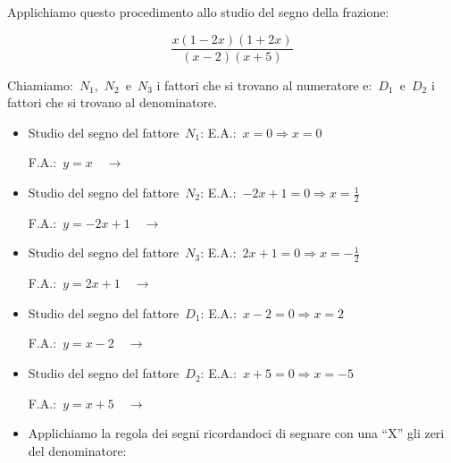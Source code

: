\begin{exrig}
 \begin{esempio}
Applichiamo questo procedimento allo studio del segno della frazione:

\[\frac{x(1 -2 x)(1 + 2 x)}{(x -2)(x +5)}\]

Chiamiamo:~$N_1$,~$N_2$~e~$N_3$ i fattori che si trovano al numeratore 
e:~$D_1$~e~$D_2$ i fattori che si trovano al denominatore.

\begin{itemize}
 \item Studio del segno del fattore~$N_1$:
 \subitem E.A.:~$x=0 \Rightarrow x=0$
 \subitem
  \begin{minipage}{.25\textwidth}
   F.A.:~$y = x \quad \rightarrow$
  \end{minipage}
  \begin{minipage}{.30\textwidth}
   
  \end{minipage}
 \item Studio del segno del fattore~$N_2$:
 \subitem E.A.:~$-2 x +1=0 \Rightarrow x=\frac{1}{2}$
 \subitem
  \begin{minipage}{.25\textwidth}
   F.A.:~$y = -2 x +1 \quad \rightarrow$
  \end{minipage}
  \begin{minipage}{.30\textwidth}
  
  \end{minipage}
 \item Studio del segno del fattore~$N_3$:
 \subitem E.A.:~$2 x +1=0 \Rightarrow x=- \frac{1}{2}$
 \subitem
  \begin{minipage}{.25\textwidth}
   F.A.:~$y=2 x +1 \quad \rightarrow$
  \end{minipage}
  \begin{minipage}{.30\textwidth}
  
  \end{minipage}
 \item Studio del segno del fattore~$D_1$:
 \subitem E.A.:~$x-2=0 \Rightarrow x=2$
 \subitem
  \begin{minipage}{.25\textwidth}
   F.A.:~$y=x-2 \quad \rightarrow$
  \end{minipage}
  \begin{minipage}{.30\textwidth}
  
  \end{minipage}
 \item Studio del segno del fattore~$D_2$:
 \subitem E.A.:~$x+5=0 \Rightarrow x=-5$
 \subitem
  \begin{minipage}{.25\textwidth}
   F.A.:~$y=x+5 \quad \rightarrow$
  \end{minipage}
  \begin{minipage}{.30\textwidth}
  
  \end{minipage}
 \item Applichiamo la regola dei segni ricordandoci di segnare con una ``X''
  gli zeri del denominatore:
  
\end{itemize}
 \end{esempio}
\end{exrig}

